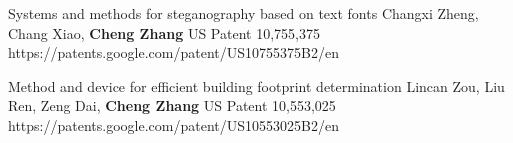 
\begin{cvpublications}{}
    
    \cvpublication
	{Systems and methods for steganography based on text fonts}
	{Changxi Zheng, Chang Xiao, \textbf{Cheng Zhang}}
	{US Patent 10,755,375}
	{https://patents.google.com/patent/US10755375B2/en}

    \cvpublication
	{Method and device for efficient building footprint determination}
	{Lincan Zou, Liu Ren, Zeng Dai, \textbf{Cheng Zhang}}
	{US Patent 10,553,025}
	{https://patents.google.com/patent/US10553025B2/en}

\end{cvpublications}